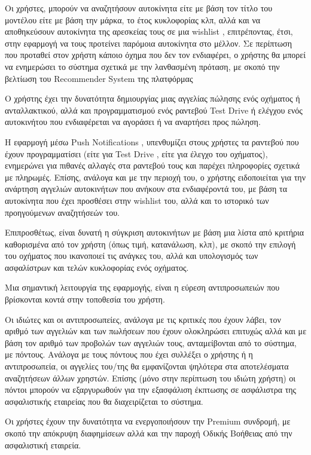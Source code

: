 \documentclass{../ol-softwaremanual}
\begin{document}
	Οι χρήστες, μπορούν να αναζητήσουν αυτοκίνητα είτε με βάση τον τίτλο του μοντέλου είτε με βάση την μάρκα, το έτος κυκλοφορίας κλπ, αλλά και να αποθηκεύσουν αυτοκίνητα της αρεσκείας τους σε μια \en wishlist \gr, επιτρέποντας, έτσι, στην εφαρμογή να τους προτείνει παρόμοια αυτοκίνητα στο μέλλον. Σε περίπτωση που προταθεί στον χρήστη κάποιο όχημα που δεν τον ενδιαφέρει, ο χρήστης θα μπορεί να ενημερώσει το σύστημα σχετικά με την λανθασμένη πρόταση, με σκοπό την βελτίωση του \en Recommender System \gr της πλατφόρμας \break 
	
	Ο χρήστης έχει την δυνατότητα δημιουργίας μιας αγγελίας πώλησης ενός οχήματος ή ανταλλακτικού, αλλά και προγραμματισμού ενός ραντεβού \en Test Drive \gr ή ελέγχου ενός αυτοκινήτου που ενδιαφέρεται να αγοράσει ή να αναρτήσει προς πώληση. \break
	
	Η εφαρμογή μέσω \en Push Notifications \gr, υπενθυμίζει στους χρήστες τα ραντεβού που έχουν προγραμματίσει (είτε για \en Test Drive \gr, είτε για έλεγχο του οχήματος), ενημερώνει για πιθανές αλλαγές στα ραντεβού τους και παρέχει πληροφορίες σχετικά με πληρωμές. Επίσης, ανάλογα και με την περιοχή του, ο χρήστης ειδοποιείται για την ανάρτηση αγγελιών αυτοκινήτων που ανήκουν στα ενδιαφέροντά του, με βάση τα αυτοκίνητα που έχει προσθέσει στην \en wishlist \gr του, αλλά και το ιστορικό των προηγούμενων αναζητήσεών του. \break
	
	Επιπροσθέτως, είναι δυνατή η σύγκριση αυτοκινήτων με βάση μια λίστα από κριτήρια καθορισμένα από τον χρήστη (όπως τιμή, κατανάλωση, κλπ), με σκοπό την επιλογή του οχήματος που ικανοποιεί τις ανάγκες του, αλλά και υπολογισμός των ασφαλίστρων και τελών κυκλοφορίας ενός οχήματος. \break
	
	Μια σημαντική λειτουργία της εφαρμογής, είναι η εύρεση αντιπροσωπειών που βρίσκονται κοντά στην τοποθεσία του χρήστη. \break
	
	Οι ιδιώτες και οι αντιπροσωπείες, ανάλογα με τις κριτικές που έχουν λάβει, τον αριθμό των αγγελιών και των πωλήσεων που έχουν ολοκληρώσει επιτυχώς αλλά και με βάση τον αριθμό των προβολών των αγγελιών τους, ανταμείβονται από το σύστημα, με πόντους. Ανάλογα με τους πόντους που έχει συλλέξει ο χρήστης ή η αντιπροσωπεία, οι αγγελίες του/της θα εμφανίζονται ψηλότερα στα αποτελέσματα αναζητήσεων άλλων χρηστών. Επίσης (μόνο στην περίπτωση του ιδιώτη χρήστη) οι πόντοι μπορούν να εξαργυρωθούν για την εξασφάλιση έκπτωσης σε ασφάλιστρα της ασφαλιστικής εταιρείας που θα διαχειρίζεται το σύστημα. \break
	
	Οι χρήστες έχουν την δυνατότητα να ενεργοποιήσουν την \en Premium \gr συνδρομή, με σκοπό την απόκρυψη διαφημίσεων αλλά και την παροχή Οδικής Βοήθειας από την ασφαλιστική εταιρεία. \break
	
\end{document}
